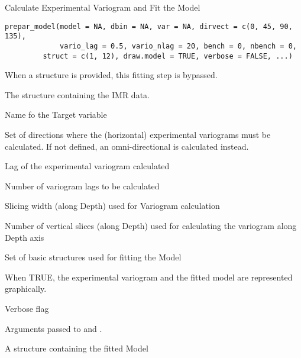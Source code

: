 %
\begin{Description}\relax
Calculate Experimental Variogram and Fit the Model 
\end{Description}
%
\begin{Usage}
\begin{verbatim}
prepar_model(model = NA, dbin = NA, var = NA, dirvect = c(0, 45, 90, 135),
             vario_lag = 0.5, vario_nlag = 20, bench = 0, nbench = 0,
	     struct = c(1, 12), draw.model = TRUE, verbose = FALSE, ...)
\end{verbatim}
\end{Usage}
%
\begin{Arguments}
\begin{ldescription}
\item[\code{model}] 
When a  structure is provided, this fitting step
is bypassed.

\item[\code{dbin}] 
The  structure containing the IMR data.

\item[\code{var}] 
Name fo the Target variable

\item[\code{dirvect}] 
Set of directions where the (horizontal) experimental variograms must be
calculated. If not defined, an omni-directional is calculated instead.

\item[\code{vario\_lag}] 
Lag of the experimental variogram calculated

\item[\code{vario\_nlag}] 
Number of variogram lags to be calculated

\item[\code{bench}] 
Slicing width (along Depth) used for Variogram calculation

\item[\code{nbench}] 
Number of vertical slices (along Depth) used for calculating the
variogram along Depth axis

\item[\code{struct}] 
Set of basic structures used for fitting the Model

\item[\code{draw.model}] 
When TRUE, the experimental variogram and the fitted model are represented
graphically.

\item[\code{verbose}] 
Verbose flag

\item[\code{...}] 
Arguments passed to  and .

\end{ldescription}
\end{Arguments}
%
\begin{Value}
A  structure containing the fitted Model
\end{Value}
